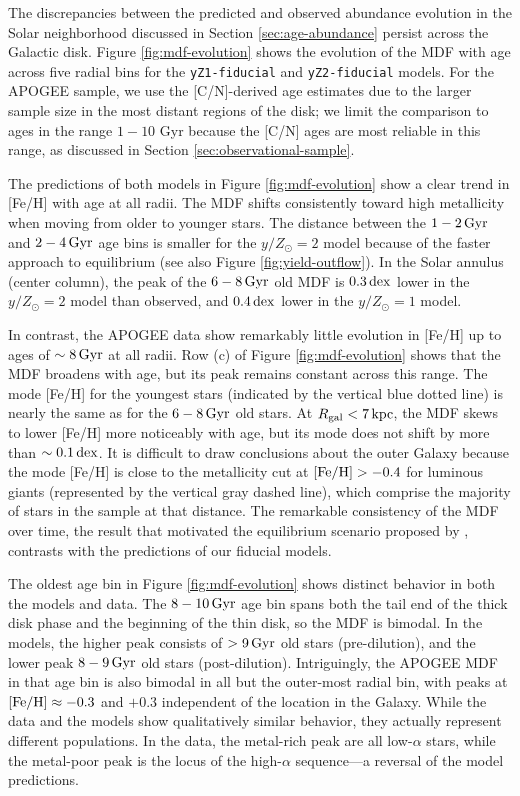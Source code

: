 \documentclass[twocolumn,twocolappendix,linenumbers]{aastex631}
\newcommand{\mathFeH}{{\rm [Fe/H]}}
\newcommand{\yZ}[1]{$y/Z_\odot=#1$}
\newcommand{\kpc}{\,{\rm kpc}}
\newcommand{\Gyr}{\,{\rm Gyr}}
\newcommand{\dex}{\,{\rm dex}}
\begin{document}
The discrepancies between the predicted and observed abundance evolution in the Solar neighborhood discussed in Section \ref{sec:age-abundance} persist across the Galactic disk. Figure \ref{fig:mdf-evolution} shows the evolution of the MDF with age across five radial bins for the {\tt yZ1-fiducial} and {\tt yZ2-fiducial} models. For the APOGEE sample, we use the [C/N]-derived age estimates due to the larger sample size in the most distant regions of the disk; we limit the comparison to ages in the range $1-10$ Gyr because the [C/N] ages are most reliable in this range, as discussed in Section \ref{sec:observational-sample}. 

The predictions of both models in Figure \ref{fig:mdf-evolution} show a clear trend in [Fe/H] with age at all radii. The MDF shifts consistently toward high metallicity when moving from older to younger stars. The distance between the $1-2\Gyr$ and $2-4\Gyr$ age bins is smaller for the \yZ{2} model because of the faster approach to equilibrium (see also Figure \ref{fig:yield-outflow}). In the Solar annulus (center column), the peak of the $6-8\Gyr$ old MDF is $0.3\dex$ lower in the \yZ{2} model than observed, and $0.4\dex$ lower in the \yZ{1} model.

In contrast, the APOGEE data show remarkably little evolution in [Fe/H] up to ages of $\sim8\Gyr$ at all radii. Row (c) of Figure \ref{fig:mdf-evolution} shows that the MDF broadens with age, but its peak remains constant across this range. The mode [Fe/H] for the youngest stars (indicated by the vertical blue dotted line) is nearly the same as for the $6-8\Gyr$ old stars. At $R_{\rm gal}<7\kpc$, the MDF skews to lower [Fe/H] more noticeably with age, but its mode does not shift by more than $\sim0.1\dex$. It is difficult to draw conclusions about the outer Galaxy because the mode [Fe/H] is close to the metallicity cut at $\mathFeH>-0.4$ for luminous giants (represented by the vertical gray dashed line), which comprise the majority of stars in the sample at that distance. The remarkable consistency of the MDF over time, the result that motivated the equilibrium scenario proposed by \citet{johnson_milky_2024}, contrasts with the predictions of our fiducial models.

The oldest age bin in Figure \ref{fig:mdf-evolution} shows distinct behavior in both the models and data. The $8-10\Gyr$ age bin spans both the tail end of the thick disk phase and the beginning of the thin disk, so the MDF is bimodal. In the models, the higher peak consists of $>9\Gyr$ old stars (pre-dilution), and the lower peak $8-9\Gyr$ old stars (post-dilution). Intriguingly, the APOGEE MDF in that age bin is also bimodal in all but the outer-most radial bin, with peaks at $\mathFeH\approx-0.3$ and $+0.3$ independent of the location in the Galaxy. While the data and the models show qualitatively similar behavior, they actually represent different populations. In the data, the metal-rich peak are all low-$\alpha$ stars, while the metal-poor peak is the locus of the high-$\alpha$ sequence---a reversal of the model predictions.
\end{document}
